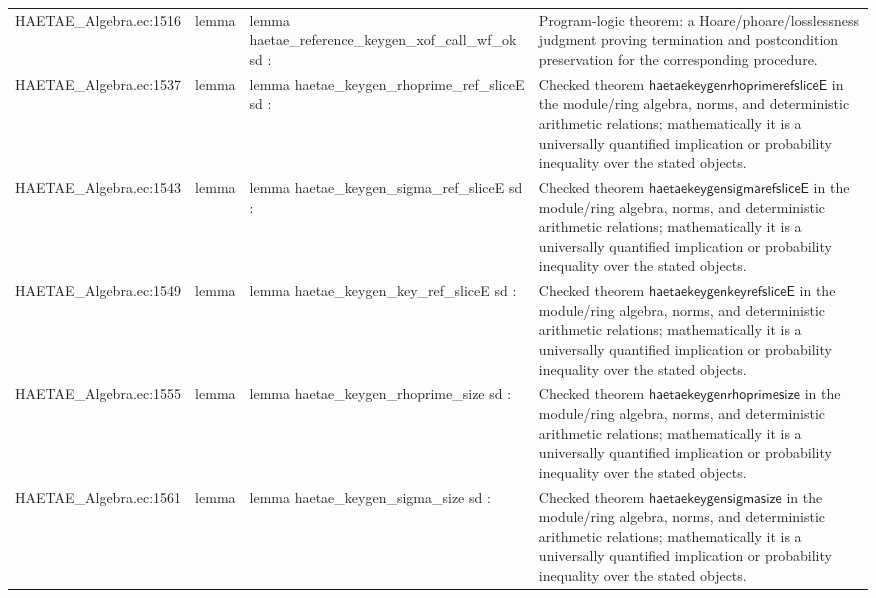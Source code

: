 \documentclass[10pt]{article}
\begin{document}
\begin{longtable}{L{0.11\textwidth}L{0.055\textwidth}L{0.385\textwidth}L{0.41\textwidth}}
HAETAE\_\allowbreak{}Algebra.\allowbreak{}ec:\allowbreak{}1516 & lemma & {\ttfamily\scriptsize lemma haetae\_\allowbreak{}reference\_\allowbreak{}keygen\_\allowbreak{}xof\_\allowbreak{}call\_\allowbreak{}wf\_\allowbreak{}ok sd :} & Program-logic theorem: a Hoare/phoare/losslessness judgment proving termination and postcondition preservation for the corresponding procedure. \\
HAETAE\_\allowbreak{}Algebra.\allowbreak{}ec:\allowbreak{}1537 & lemma & {\ttfamily\scriptsize lemma haetae\_\allowbreak{}keygen\_\allowbreak{}rhoprime\_\allowbreak{}ref\_\allowbreak{}sliceE sd :} & Checked theorem $\mathsf{haetaekeygenrhoprimerefsliceE}$ in the module/ring algebra, norms, and deterministic arithmetic relations; mathematically it is a universally quantified implication or probability inequality over the stated objects. \\
HAETAE\_\allowbreak{}Algebra.\allowbreak{}ec:\allowbreak{}1543 & lemma & {\ttfamily\scriptsize lemma haetae\_\allowbreak{}keygen\_\allowbreak{}sigma\_\allowbreak{}ref\_\allowbreak{}sliceE sd :} & Checked theorem $\mathsf{haetaekeygensigmarefsliceE}$ in the module/ring algebra, norms, and deterministic arithmetic relations; mathematically it is a universally quantified implication or probability inequality over the stated objects. \\
HAETAE\_\allowbreak{}Algebra.\allowbreak{}ec:\allowbreak{}1549 & lemma & {\ttfamily\scriptsize lemma haetae\_\allowbreak{}keygen\_\allowbreak{}key\_\allowbreak{}ref\_\allowbreak{}sliceE sd :} & Checked theorem $\mathsf{haetaekeygenkeyrefsliceE}$ in the module/ring algebra, norms, and deterministic arithmetic relations; mathematically it is a universally quantified implication or probability inequality over the stated objects. \\
HAETAE\_\allowbreak{}Algebra.\allowbreak{}ec:\allowbreak{}1555 & lemma & {\ttfamily\scriptsize lemma haetae\_\allowbreak{}keygen\_\allowbreak{}rhoprime\_\allowbreak{}size sd :} & Checked theorem $\mathsf{haetaekeygenrhoprimesize}$ in the module/ring algebra, norms, and deterministic arithmetic relations; mathematically it is a universally quantified implication or probability inequality over the stated objects. \\
HAETAE\_\allowbreak{}Algebra.\allowbreak{}ec:\allowbreak{}1561 & lemma & {\ttfamily\scriptsize lemma haetae\_\allowbreak{}keygen\_\allowbreak{}sigma\_\allowbreak{}size sd :} & Checked theorem $\mathsf{haetaekeygensigmasize}$ in the module/ring algebra, norms, and deterministic arithmetic relations; mathematically it is a universally quantified implication or probability inequality over the stated objects. \\

\end{longtable}
\end{document}
